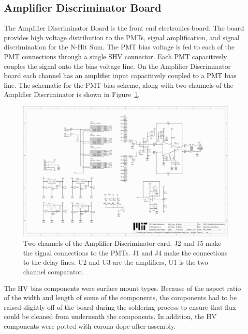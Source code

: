 \documentclass{JINST}
\begin{document}
\subsection{Amplifier Discriminator Board}
\label{sec:Amp-Disc}
%
The Amplifier Discriminator Board is the front end electronics board.
The board provides high voltage distribution to the PMTs, signal
amplification, and signal discrimination for the N-Hit Sum.  The PMT
bias voltage is fed to each of the PMT connections through a single
SHV connector.  Each PMT capacitively couples the signal onto the bias
voltage line.  On the Amplifier Discriminator board each channel has
an amplifier input capacitively coupled to a PMT bias line.  The schematic for the
PMT bias scheme, along with two channels of the Amplifier Discriminator is shown in Figure~\ref{fig:ampdiscsch}.

\begin{figure}[ht]
\begin{center}
\includegraphics[width=5.5in, keepaspectratio=true, page=2, trim=4.54in 2.12in 4.54in 2.12in, clip=true]{graphics/veto_sch.pdf}
\caption{Two channels of the Amplifier Discriminator card.  J2 and J5 make the signal connections to the PMTs.  J1 and J4 make the connections to the delay lines.  U2 and U3 are the amplifiers, U1 is the two channel comparator.
\label{fig:ampdiscsch}}
\end{center}
\end{figure}

The HV bias components were surface mount types.  Because of the
aspect ratio of the width and length of some of the components, the
components had to be raised slightly off of the board during the
soldering process to ensure that flux could be cleaned from underneath
the components.  In addition, the HV components were potted with
corona dope after assembly.
\end{document}
